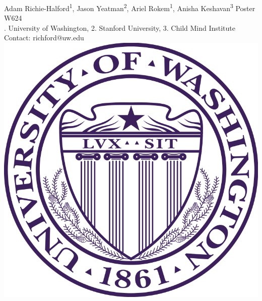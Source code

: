 \documentclass[a0paper,portrait,fontscale=0.395]{baposter}
\begin{document}
\begin{poster}
{\vspace{0.3em}\hspace{0.5em} Adam Richie-Halford\textsuperscript{1}, Jason Yeatman\textsuperscript{2}, Ariel Rokem\textsuperscript{1}, Anisha Keshavan\textsuperscript{3} \hfill Poster W624 \hspace{0.5em}\null \\ %
{\hspace{0.65em}. University of Washington, 2. Stanford University, 3. Child Mind Institute \hfill Contact: richford@uw.edu \hspace{0.5em}\null}} %
{\includegraphics[scale=0.12]{UWlogo.png}} %


\end{poster}
\end{document}
